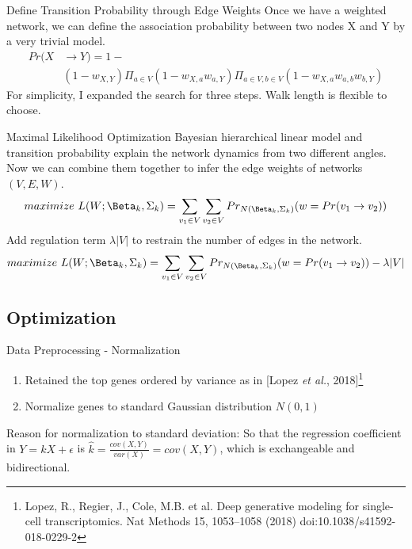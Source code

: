 \documentclass[handout,t]{beamer}
\begin{document}
\begin{frame}{Define Transition Probability through Edge Weights}
Once we have a weighted network, we can define the association probability between two nodes X and Y by a very trivial model.
\begin{equation}\begin{split}
   Pr(X& \rightarrow Y) = 1-\\
   &(1-w_{X, Y})\Pi_{a\in V}(1-w_{X, a}w_{a, Y})\Pi_{a\in V, b\in V}(1-w_{X, a}w_{a, b}w_{b, Y})
\end{split}\end{equation}
For simplicity, I expanded the search for three steps. Walk length is flexible to choose.
\end{frame}

\begin{frame}{Maximal Likelihood Optimization}
Bayesian hierarchical linear model and transition probability explain the network dynamics from two different angles. Now we can combine them together to infer the edge weights of networks $(V, E, W)$.
\begin{equation}
   maximize\ L(W; \Beta_k, \Sigma_k) = \sum_{v_1\in V} \sum_{v_2\in V} Pr_{N(\Beta_k, \Sigma_k)} (w=Pr(v_1\rightarrow v_2))
\end{equation}
Add regulation term $\lambda |V|$ to restrain the number of edges in the network.
\begin{equation}
   maximize\ L(W; \Beta_k, \Sigma_k) = \sum_{v_1\in V} \sum_{v_2\in V} Pr_{N(\Beta_k, \Sigma_k)} (w=Pr(v_1\rightarrow v_2)) - \lambda |V|
\end{equation}
\end{frame}


\subsection{Optimization}
\begin{frame}{Data Preprocessing - Normalization}
\begin{enumerate}
\item Retained the top genes ordered by variance as in [Lopez \textit{et al.}, 2018]\footnote{Lopez, R., Regier, J., Cole, M.B. et al. Deep generative modeling for single-cell transcriptomics. Nat Methods 15, 1053–1058 (2018) doi:10.1038/s41592-018-0229-2}
\item Normalize genes to standard Gaussian distribution $N(0, 1)$
\end{enumerate}
Reason for normalization to standard deviation: So that the regression coefficient in $Y=kX+\epsilon$ is $\hat{k} = \frac{cov(X, Y)}{var(X)} = cov(X, Y)$, which is exchangeable and bidirectional.
\end{frame}
\end{document}
